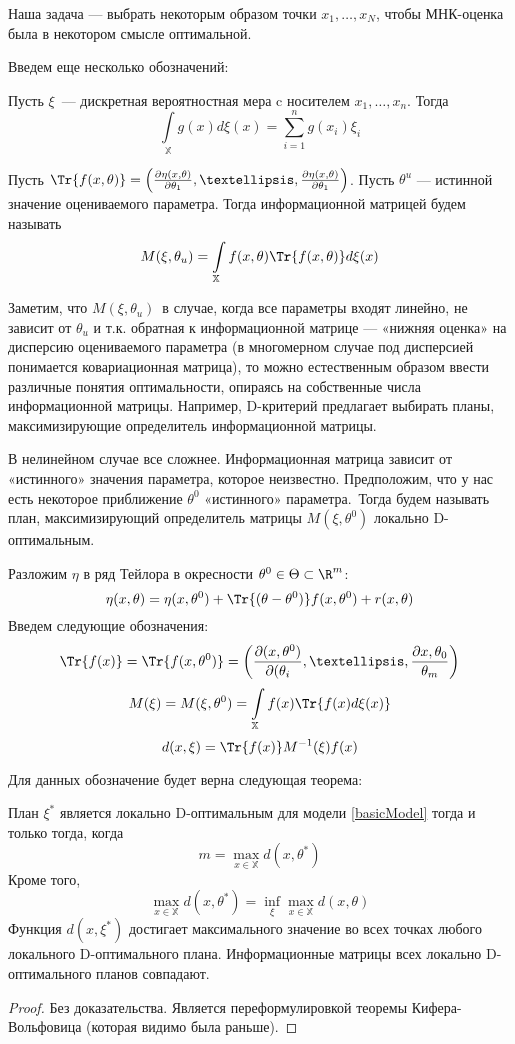 Наша задача — выбрать некоторым образом точки $x_1, …, x_N$, чтобы МНК-оценка была в некотором смысле оптимальной. 

Введем еще несколько обозначений:
\begin{dfn}
Пусть $\xi$ — дискретная вероятностная мера c носителем $x_1,…, x_n$. Тогда
$$ \int\limits_{\mathbb{X}} g(x) d\xi(x) = \sum \limits_{i=1}^{n}  g(x_i)\xi_i$$
\end{dfn}

\begin{dfn}
Пусть $\Tr{f(x,\theta)} = \left(\frac{\partial\eta(x,\theta)}{\partial \theta_1}, …, \frac{\partial\eta(x,\theta)}{\partial \theta_1}\right)$. 
Пусть $\theta^u$ — истинной значение оцениваемого параметра. Тогда информационной матрицей будем называть
$$M(\xi, \theta_u) = \int\limits_{\mathbb{X}} f(x, \theta)\Tr{f(x, \theta)}d\xi(x)$$
\end{dfn}


Заметим, что $M(\xi, \theta_u)$ в случае, когда все параметры входят линейно, не зависит от $\theta_u$ и  т.к. обратная к информационной матрице — «нижняя оценка» на дисперсию оцениваемого параметра (в многомерном случае под дисперсией  понимается ковариационная матрица), то можно естественным образом ввести различные понятия оптимальности, опираясь на собственные числа информационной матрицы. Например, D-критерий предлагает выбирать планы, максимизирующие определитель информационной матрицы. 

В нелинейном случае все сложнее. Информационная матрица зависит от «истинного» значения параметра, которое неизвестно. Предположим, что у нас есть некоторое приближение $\theta^0$ «истинного» параметра. Тогда будем называть план, максимизирующий определитель матрицы $M(\xi, \theta^0)$ локально D-оптимальным. 

Разложим $\eta$ в ряд Тейлора в окресности $\theta^0 \in \Theta \subset \R^m$:
$$\eta(x, \theta) = \eta(x, \theta^0) + \Tr{(\theta-\theta^0)}f(x, \theta^0) + r(x,\theta)$$
Введем следующие обозначения:
$$ \Tr{f(x)} = \Tr{f(x, \theta^0)} = \left(\frac{\partial(x, \theta^0)}{\partial(\theta_i}, …, \frac{\partial x, \theta_0}{\theta_m}\right)$$
$$ M(\xi) = M(\xi, \theta^0) = \int\limits_{\mathbb{X}} f(x) \Tr{f(x)d\xi(x)}$$
$$d(x, \xi) = \Tr{f(x)} M^{-1}(\xi)f(x)$$

Для данных обозначение будет верна следующая теорема:
\begin{thm}[Эквивалентности]
План $\xi^*$ является локально D-оптимальным для модели \eqref{basicModel} тогда и только тогда, когда 
$$ m = \max\limits_{x\in \mathbb{X}} d(x, \theta^*)$$
Кроме того, 
$$ \max \limits_{x \in \mathbb{X}} d(x, \theta^*) = \inf\limits_{\xi}\max\limits_{x\in\mathbb{X}} d(x, \theta)$$
Функция $d(x, \xi^*)$ достигает максимального значение во всех точках любого локального D-оптимального плана.
Информационные матрицы всех локально D-оптимального планов совпадают.
\end{thm}
\begin{proof}
Без доказательства. Является переформулировкой теоремы Кифера-Вольфовица (которая видимо была раньше).
\end{proof}



